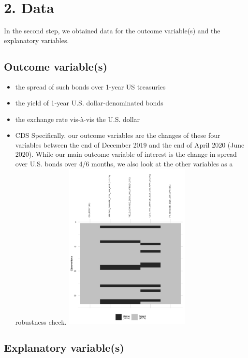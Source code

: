 \documentclass[11pt,]{article}
\providecommand{\tightlist}{%
\setlength{\itemsep}{0pt}\setlength{\parskip}{0pt}}
\begin{document}
\hypertarget{data}{%
\section{2. Data}\label{data}}

In the second step, we obtained data for the outcome variable(s) and the
explanatory variables.

\hypertarget{outcome-variables}{%
\subsection{Outcome variable(s)}\label{outcome-variables}}

\begin{itemize}
\tightlist
\item
  the spread of such bonds over 1-year US treasuries
\item
  the yield of 1-year U.S. dollar-denominated bonds
\item
  the exchange rate vis-à-vis the U.S. dollar
\item
  CDS Specifically, our outcome variables are the changes of these four
  variables between the end of December 2019 and the end of April 2020
  (June 2020). While our main outcome variable of interest is the change
  in spread over U.S. bonds over 4/6 months, we also look at the other
  variables as a robustness check.
  \includegraphics[width=0.5\textwidth,height=\textheight]{reportfigures/missingdata_dependentvariable.png}
\end{itemize}

\hypertarget{explanatory-variables}{%
\subsection{Explanatory variable(s)}\label{explanatory-variables}}
\end{document}
